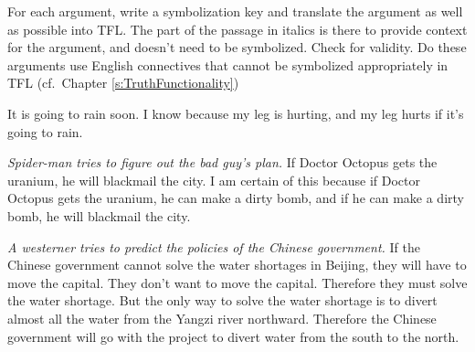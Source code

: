\begin{practiceproblems}
\problempart
For each argument, write a symbolization key and translate the argument as well as possible into TFL. The part of the passage in italics is there to provide context for the argument, and doesn't need to be symbolized. Check for validity. Do these arguments use English connectives that cannot be symbolized appropriately in TFL (cf.~Chapter \ref{s:TruthFunctionality})
\begin{earg}
\item It is going to rain soon. I know because my leg is hurting, and my leg hurts if it's going to rain.



\item  \emph{Spider-man tries to figure out the bad guy's plan.} If Doctor Octopus gets the uranium, he will blackmail the city. I am certain of this because if Doctor Octopus gets the uranium, he can make a dirty bomb, and if he can make a dirty bomb, he will blackmail the city.



\item \emph{A westerner tries to predict the policies of the Chinese government.} If the Chinese government cannot solve the water shortages in Beijing, they will have to move the capital. They don't want to move the capital. Therefore they must solve the water shortage. But the only way to solve the water shortage is to divert almost all the water from the Yangzi river northward. Therefore the Chinese government will go with the project to divert water from the south to the north.




\end{earg}
\end{practiceproblems}

